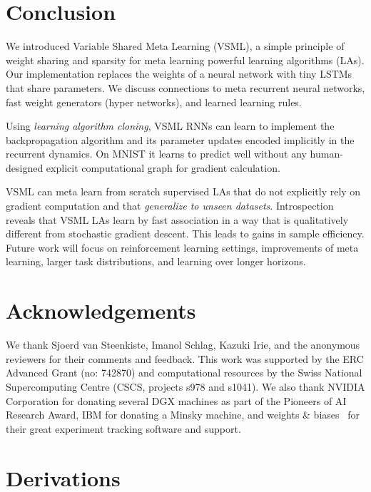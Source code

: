 \documentclass{article}
\newcommand{\principle}{VSML}
\newcommand{\principlefull}{Variable Shared Meta Learning}
\newcommand{\approachfull}{VSML RNNs}
\begin{document}
\section{Conclusion}

We introduced {\principlefull} (VSML), a simple principle of weight sharing and sparsity for meta learning powerful learning algorithms (LAs).
Our implementation replaces the weights of a neural network with tiny LSTMs that share parameters.
We discuss connections to meta recurrent neural networks, fast weight generators (hyper networks), and learned learning rules.

Using \emph{learning algorithm cloning}, {\approachfull} can learn to implement the backpropagation algorithm and its parameter updates encoded implicitly in the recurrent dynamics.
On MNIST it learns to predict well without any human-designed explicit computational graph for gradient calculation.

{\principle} can meta learn from scratch supervised LAs that do not explicitly rely on gradient computation and that \emph{generalize to unseen datasets}.
Introspection reveals that {\principle} LAs learn by fast association in a way that is qualitatively different from stochastic gradient descent.
This leads to gains in sample efficiency.
Future work will focus on reinforcement learning settings, improvements of meta learning, larger task distributions, and learning over longer horizons.

\newpage

\section*{Acknowledgements}
We thank Sjoerd van Steenkiste, Imanol Schlag, Kazuki Irie, and the anonymous reviewers for their comments and feedback.
This work was supported by the ERC Advanced Grant (no: 742870) and computational resources by the Swiss National Supercomputing Centre (CSCS, projects s978 and s1041).
We also thank NVIDIA Corporation for donating several DGX machines as part of the Pioneers of AI Research Award, IBM for donating a Minsky machine, and weights \& biases~\citep{biewald2020} for their great experiment tracking software and support.



\newpage

\newpage
\appendix

\section{Derivations}\label{sec:rnn-equiv-derivation}
\end{document}
